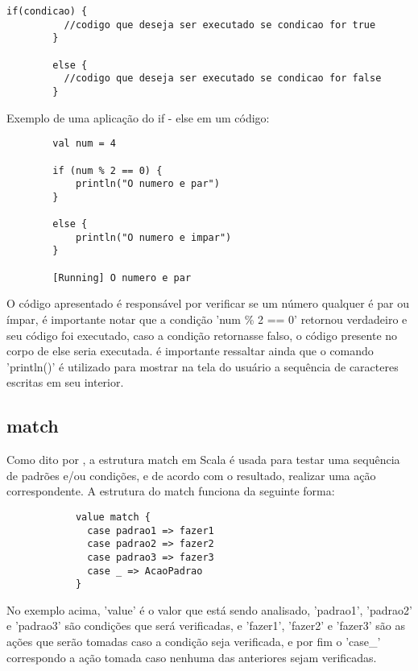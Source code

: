 	\begin{lstlisting}[breaklines]
		if(condicao) {
		  //codigo que deseja ser executado se condicao for true	
		}   
	
		else {
		  //codigo que deseja ser executado se condicao for false
		}
	\end{lstlisting}

	Exemplo de uma aplica\c{c}\~{a}o do if - else em um c\'{o}digo:
	
	\begin{lstlisting}
		val num = 4
		
		if (num % 2 == 0) {
			println("O numero e par")
		}
		
		else {
			println("O numero e impar")
		}
	
		[Running] O numero e par
	\end{lstlisting}

	O c\'{o}digo apresentado \'{e} respons\'{a}vel por verificar se um n\'{u}mero qualquer \'{e} par ou ímpar, \'{e} importante notar que a condi\c{c}\~{a}o 'num \% 2 == 0' retornou verdadeiro e seu c\'{o}digo foi executado, caso a condi\c{c}\~{a}o retornasse falso, o c\'{o}digo presente no corpo de else seria executada. \'{e} importante ressaltar ainda que o comando 'println()' \'{e} utilizado para mostrar na tela do usu\'{a}rio a sequ\^{e}ncia de caracteres escritas em seu interior.
	
	\subsection{match}
	
	Como dito por \cite{Odersky}, a estrutura match em Scala \'{e} usada para testar uma sequ\^{e}ncia de padrões e/ou condi\c{c}\~{o}es, e de acordo com o resultado, realizar uma ação correspondente. A estrutura do match funciona da seguinte forma:
	
	\begin{lstlisting}
		    value match {
			  case padrao1 => fazer1
			  case padrao2 => fazer2
			  case padrao3 => fazer3
			  case _ => AcaoPadrao
		    }
	\end{lstlisting}

	No exemplo acima, 'value' \'{e} o valor que est\'{a} sendo analisado, 'padrao1', 'padrao2' e 'padrao3' s\~{a}o condi\c{c}\~{o}es que ser\'{a} verificadas, e 'fazer1', 'fazer2' e 'fazer3' s\~{a}o as ações que serão tomadas caso a condi\c{c}\~{a}o seja verificada, e por fim o 'case\_' correspondo a ação tomada caso nenhuma das anteriores sejam verificadas.
	

